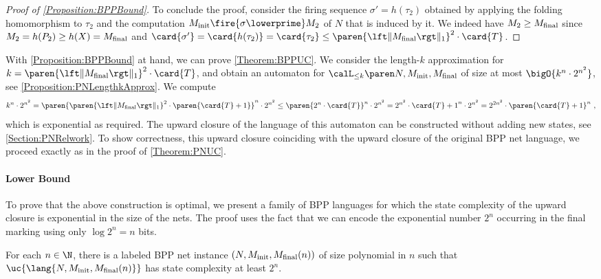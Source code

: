 \documentclass[../../diss.tex]{subfiles}
\begin{document}
\begin{proof}[Proof of \cref{Proposition:BPPBound}]
    To conclude the proof, consider the firing sequence $\sigma' = h(\tau_2)$ obtained by applying the folding homomorphism to $\tau_2$ and the computation $\Minit \fire{\sigma\lowerprime} M_2$ of $N$ that is induced by it.
    We indeed have $M_2 \geq M_{\text{final}}$ since $M_2 = h(P_2) \geq h(X) = M_{\text{final}}$ and $\card{\sigma'} = \card{h(\tau_2)} = \card{\tau_2} \leq \paren{\normone{\Mfinal}}^2 \cdot \card{T}$.
\end{proof}

With \cref{Proposition:BPPBound} at hand, we can prove \cref{Theorem:BPPUC}.
We consider the length-$k$ approximation for $k = \paren{\normone{\Mfinal}}^2 \cdot \card{T}$, and obtain an automaton for $\languak{k}{N,\Minit,\Mfinal}$ of size at most
\(
    \bigO{k^n \cdot 2^{n^2}}
\), see \cref{Proposition:PNLengthkApprox}.
We compute
\[
    k^n \cdot 2^{n^2}
    =
    \paren{\paren{\normone{\Mfinal}}^2 \cdot \paren{\card{T}+1}}^n \cdot 2^{n^2}
    \leq \paren{2^n \cdot \card{T}}^n \cdot 2^{n^2}
    = 2^{n^2} \cdot {\card{T}+1}^n \cdot 2^{n^2}
    = 2^{2 n^2} \cdot \paren{\card{T} +1}^n
    \ ,
\]
which is exponential as required.
The upward closure of the language of this automaton can be constructed without adding new states, see \cref{Section:PNRelwork}.
To show correctness, \ie this upward closure coinciding with the upward closure of the original BPP net language, we proceed exactly as in the proof of \cref{Theorem:PNUC}.

\paragraph{Lower Bound}

To prove that the above construction is optimal, we present a family of BPP languages for which the state complexity of the upward closure is exponential in the size of the nets.
The proof uses the fact that we can encode the exponential number $2^n$ occurring in the final marking using only $\log 2^n = n$ bits.

\begin{proposition}%
\label{Proposition:BPPUChardness}%
    For each $n \in \N$, there is a labeled BPP net instance $(N, M_{\text{init}}, M_{\text{final}}(n))$ of size polynomial in $n$ such that $\uc{\lang{N, \Minit, \Mfinal(n)}}$ has state complexity at least $2^n$.
\end{proposition}
\end{document}
